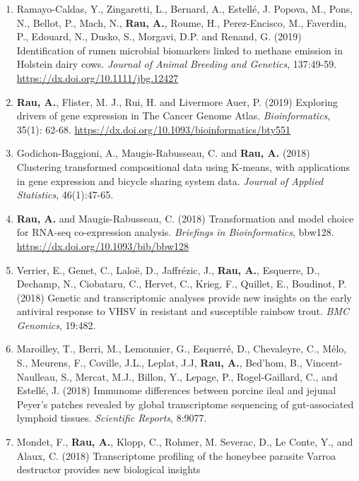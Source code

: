 \documentclass[11pt, a4paper]{awesome-cv}
\begin{document}
\begin{enumerate}
  cancer patients. \emph{G3: Genes\textbar Genomes\textbar Genetics},
  9(5): 1739-1743. \url{https://dx.doi.org/10.1534/g3.118.200873}
\item
  Ramayo-Caldas, Y., Zingaretti, L., Bernard, A., Estellé, J. Popova,
  M., Pons, N., Bellot, P., Mach, N., \textbf{Rau, A.}, Roume, H.,
  Perez-Encisco, M., Faverdin, P., Edouard, N., Dusko, S., Morgavi, D.P.
  and Renand, G. (2019) Identification of rumen microbial biomarkers
  linked to methane emission in Holstein dairy cows. \emph{Journal of
  Animal Breeding and Genetics}, 137:49-59.
  \url{https://dx.doi.org/10.1111/jbg.12427}
\item
  \textbf{Rau, A.}, Flister, M. J., Rui, H. and Livermore Auer, P.
  (2019) Exploring drivers of gene expression in The Cancer Genome
  Atlas. \emph{Bioinformatics}, 35(1): 62-68.
  \url{https://dx.doi.org/10.1093/bioinformatics/bty551}
\item
  Godichon-Baggioni, A., Maugis-Rabusseau, C. and \textbf{Rau, A.}
  (2018) Clustering transformed compositional data using K-means, with
  applications in gene expression and bicycle sharing system data.
  \emph{Journal of Applied Statistics}, 46(1):47-65.
\item
  \textbf{Rau, A.} and Maugis-Rabusseau, C. (2018) Transformation and
  model choice for RNA-seq co-expression analysis. \emph{Briefings in
  Bioinformatics}, bbw128. \url{https://dx.doi.org/10.1093/bib/bbw128}
\item
  Verrier, E., Genet, C., Laloë, D., Jaffrézic, J., \textbf{Rau, A.},
  Esquerre, D., Dechamp, N., Ciobataru, C., Hervet, C., Krieg, F.,
  Quillet, E., Boudinot, P. (2018) Genetic and transcriptomic analyses
  provide new insights on the early antiviral response to VHSV in
  resistant and susceptible rainbow trout. \emph{BMC Genomics}, 19:482.
\item
  Maroilley, T., Berri, M., Lemonnier, G., Esquerré, D., Chevaleyre, C.,
  Mélo, S., Meurens, F., Coville, J.L., Leplat, J.J, \textbf{Rau, A.},
  Bed'hom, B., Vincent-Naulleau, S., Mercat, M.J., Billon, Y., Lepage,
  P., Rogel-Gaillard, C., and Estellé, J. (2018) Immunome differences
  between porcine ileal and jejunal Peyer's patches revealed by global
  transcriptome sequencing of gut-associated lymphoid tissues.
  \emph{Scientific Reports}, 8:9077.
\item
  Mondet, F., \textbf{Rau, A.}, Klopp, C., Rohmer, M. Severac, D., Le
  Conte, Y., and Alaux, C. (2018) Transcriptome profiling of the
  honeybee parasite Varroa destructor provides new biological insights

\end{enumerate}
\end{document}
